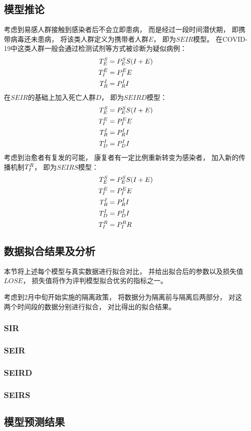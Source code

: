 \subsection{模型推论}
考虑到易感人群接触到感染者后不会立即患病，
而是经过一段时间潜伏期，
即携带病毒还未患病，
将该类人群定义为携带者人群$E$，
即为$SEIR$模型。
在COVID-19中这类人群一般会通过检测试剂等方式被诊断为疑似病例：
\begin{align}
    T^{S}_{E}&=P^{S}_{E}S(I+E) \\
    T^{E}_{I}&=P^{E}_{I}E      \\
    T^{I}_{R}&=P^{I}_{R}I
\end{align}
在$SEIR$的基础上加入死亡人群$D$，
即为$SEIRD$模型：
\begin{align}
    T^{S}_{E}&=P^{S}_{E}S(I+E) \\
    T^{E}_{I}&=P^{E}_{I}E      \\
    T^{I}_{R}&=P^{I}_{R}I      \\
    T^{I}_{D}&=P^{I}_{D}I
\end{align}
考虑到治愈者有复发的可能，
康复者有一定比例重新转变为感染者，
加入新的传播机制$T^{R}_{I}$，
即为$SEIRS$模型：
\begin{align}
    T^{S}_{E}&=P^{S}_{E}S(I+E) \\
    T^{E}_{I}&=P^{E}_{I}E      \\
    T^{I}_{R}&=P^{I}_{R}I      \\
    T^{I}_{D}&=P^{I}_{D}I      \\
    T^{R}_{I}&=P^{R}_{I}R
\end{align}
\subsection{数据拟合结果及分析\label{section:数据拟合与分析}}
本节将上述每个模型与真实数据进行拟合对比，
并给出拟合后的参数以及损失值$LOSE$，
损失值将作为评判模型拟合优劣的指标之一。
\par 考虑到2月中旬开始实施的隔离政策，
将数据分为隔离前与隔离后两部分，
对这两个时间段的数据分别进行拟合，
对比得出的拟合结果。
\subsubsection{SIR}
\subsubsection{SEIR}
\subsubsection{SEIRD}
\subsubsection{SEIRS}
\subsection{模型预测结果}